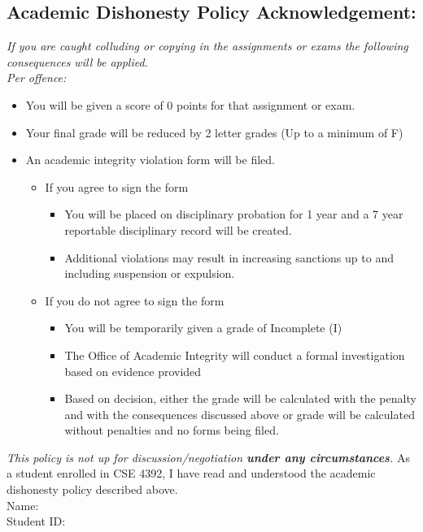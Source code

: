 \documentclass{article}
\begin{document}
\subsection*{Academic Dishonesty Policy Acknowledgement:}
\textit{If you are caught colluding or copying in the assignments or exams the following consequences will
be applied.}\\
\textit{Per offence:}
\begin{itemize}
    \item You will be given a score of 0 points for that assignment or exam.
    \item Your final grade will be reduced by 2 letter grades (Up to a minimum of F)
    \item An academic integrity violation form will be filed.
    \begin{itemize}
        \item If you agree to sign the form
        \begin{itemize}
            \item You will be placed on disciplinary probation for 1 year and a 7 year reportable
            disciplinary record will be created.
            \item Additional violations may result in increasing sanctions up to and including
            suspension or expulsion.
        \end{itemize}
        \item If you do not agree to sign the form
        \begin{itemize}
            \item You will be temporarily given a grade of Incomplete (I)
            \item The Office of Academic Integrity will conduct a formal investigation based on
            evidence provided
            \item Based on decision, either the grade will be calculated with the penalty and with
            the consequences discussed above or grade will be calculated without
            penalties and no forms being filed.
        \end{itemize}
    \end{itemize}
\end{itemize}
\textit{This policy is not up for discussion/negotiation \textbf{under any circumstances}.}
\newline
As a student enrolled in CSE 4392, I have read and understood the academic dishonesty policy
described above.\\
\newline
Name:\\
Student ID:\\
\end{document}
